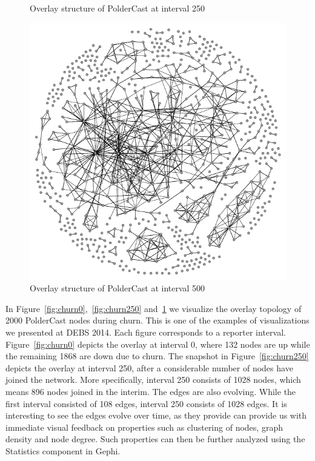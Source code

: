 \begin{figure}[h]
    \caption{Overlay structure  of PolderCast at interval 250}
    \label{fig:churn250}
    \includegraphics[scale=0.85]{figures/churn_500}
    \caption{Overlay structure of PolderCast at interval 500}
    \label{fig:churn500}
\end{figure}

In Figure~\ref{fig:churn0},~\ref{fig:churn250} and~\ref{fig:churn500} we
visualize the overlay topology of 2000 PolderCast nodes during churn.
This is one of the examples of visualizations we presented at DEBS 2014.
Each figure corresponds to a reporter interval. Figure~\ref{fig:churn0}
depicts the overlay at interval 0, where 132 nodes are up while the
remaining 1868 are down due to churn. The snapshot in
Figure~\ref{fig:churn250} depicts the overlay at interval 250, after a
considerable number of nodes have joined the network. More specifically,
interval 250 consists of 1028 nodes, which means 896 nodes joined in the
interim. The edges are also evolving. While the first interval consisted
of 108 edges, interval 250 consists of 1028 edges. It is interesting to
see the edges evolve over time, as they provide can provide us with
immediate visual feedback on properties such as clustering of nodes,
graph density and node degree. Such properties can then be further
analyzed using the Statistics component in Gephi.

